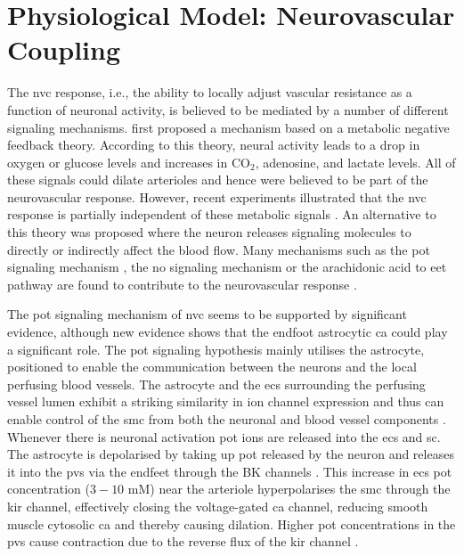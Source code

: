 \section{Physiological Model: Neurovascular Coupling}\label{sec:model}
The \gls{nvc} response, i.e., the ability to locally adjust vascular resistance as a function of neuronal activity, is believed to be mediated by a number of different signaling mechanisms. \cite{Roy1890} first proposed a  mechanism based on a metabolic negative feedback theory. According to this theory, neural activity leads to a drop in oxygen or glucose levels and increases in CO$_2$, adenosine, and lactate levels. All of these signals could dilate arterioles and hence were believed to be part of the neurovascular response. However, recent experiments illustrated that the \gls{nvc} response is partially independent of these metabolic signals \cite{Leithner2010, Lindauer2010, Mintun2001, Powers1996, Makani2010}. An alternative to this theory was proposed where the neuron releases signaling molecules to directly or indirectly affect the blood flow. Many mechanisms such as the \gls{pot} signaling mechanism \cite{Filosa2006}, the \gls{no} signaling mechanism or the arachidonic acid to \gls{eet} pathway are found to contribute to the neurovascular response \cite{Attwell2010}.

The \gls{pot} signaling mechanism of \gls{nvc} seems to be supported by significant evidence, although new evidence shows that the endfoot astrocytic \gls{ca} could play a significant role. The \gls{pot} signaling hypothesis mainly utilises the astrocyte,  positioned to enable the communication between the neurons and the local perfusing blood vessels. The astrocyte and the \glspl{ec} surrounding the perfusing vessel lumen exhibit a striking similarity in ion channel expression and thus can enable control of the \gls{smc} from both the neuronal and blood vessel components \cite{Longden2015}. Whenever there is neuronal activation \gls{pot} ions are released into the \gls{ecs} and \gls{sc}. The astrocyte is depolarised by taking up \gls{pot} released by the neuron and releases it into the \gls{pvs} via the endfeet through the BK channels \citep{Filosa2007}. This increase in \gls{ecs} \gls{pot} concentration ($3-10$ mM) near the arteriole hyperpolarises the \gls{smc} through the \gls{kir} channel, effectively closing the voltage-gated \gls{ca} channel, reducing smooth muscle cytosolic \gls{ca} and thereby causing dilation. Higher \gls{pot} concentrations in the \gls{pvs} cause contraction due to the reverse flux of the \gls{kir} channel \citep{Farr2011}. 


